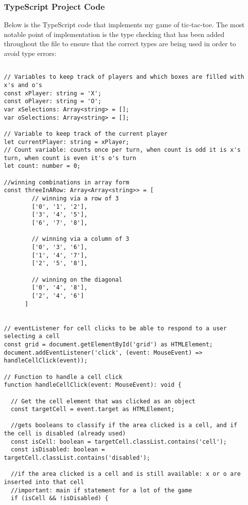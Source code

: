 \documentclass{article}
\theoremstyle{theorem}
\theoremstyle{definition}
\theoremstyle{remark}
\begin{document}
\subsubsection{TypeScript Project Code}
Below is the TypeScript code that implements my game of tic-tac-toe. The most notable point of implementation is the type checking that has been added throughout the file to ensure that the correct types are being used in order to avoid type errors:

\begin{lstlisting}

// Variables to keep track of players and which boxes are filled with x's and o's
const xPlayer: string = 'X';
const oPlayer: string = 'O';
var xSelections: Array<string> = [];
var oSelections: Array<string> = [];

// Variable to keep track of the current player
let currentPlayer: string = xPlayer;
// Count variable: counts once per turn, when count is odd it is x's turn, when count is even it's o's turn
let count: number = 0;

//winning combinations in array form
const threeInARow: Array<Array<string>> = [
        // winning via a row of 3
        ['0', '1', '2'],
        ['3', '4', '5'],
        ['6', '7', '8'],

        // winning via a column of 3
        ['0', '3', '6'],
        ['1', '4', '7'],
        ['2', '5', '8'],

        // winning on the diagonal
        ['0', '4', '8'],
        ['2', '4', '6']
      ]


// eventListener for cell clicks to be able to respond to a user selecting a cell
const grid = document.getElementById('grid') as HTMLElement;
document.addEventListener('click', (event: MouseEvent) => handleCellClick(event));

// Function to handle a cell click
function handleCellClick(event: MouseEvent): void {

  // Get the cell element that was clicked as an object
  const targetCell = event.target as HTMLElement;

  //gets booleans to classify if the area clicked is a cell, and if the cell is disabled (already used)
  const isCell: boolean = targetCell.classList.contains('cell');
  const isDisabled: boolean = targetCell.classList.contains('disabled');

  //if the area clicked is a cell and is still available: x or o are inserted into that cell
  //important: main if statement for a lot of the game
  if (isCell && !isDisabled) {


\end{lstlisting}
\end{document}
